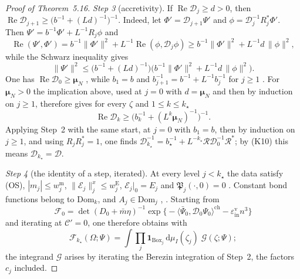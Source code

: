 \documentclass[11pt]{amsart}
\theoremstyle{definition}
\begin{document}
\begin{proof}[Proof of Theorem~5.16]
\emph{Step 3} (accretivity).
If $\operatorname{Re}\mathcal D_j\ge d>0$, then $\operatorname{Re}\mathcal D_{j+1}\ge\bigl(b^{-1}+(Ld)^{-1}\bigr)^{-1}$.
Indeed, let $\Phi'=\mathcal D_{j+1}\Psi'$ and $\phi=\mathcal D_j^{-1}R_j^*\Phi'$.
Then $\Psi'=b^{-1}\Phi'+L^{-1}R_j\phi$ and
\begin{equation*}
\operatorname{Re}(\Psi',\Phi')=b^{-1}\|\Phi'\|^2+L^{-1}\operatorname{Re}(\phi,\mathcal D_j\phi)\ge b^{-1}\|\Phi'\|^2+L^{-1}d\,\|\phi\|^2,
\end{equation*}
while the Schwarz inequality gives
\begin{equation*}
\|\Psi'\|^2\le\bigl(b^{-1}+(Ld)^{-1}\bigr)\bigl(b^{-1}\|\Phi'\|^2+L^{-1}d\,\|\phi\|^2\bigr).
\end{equation*}
One has $\operatorname{Re}\mathcal D_0\ge\boldsymbol\mu_N$ \cite[(I.O2)]{QEDIII}, while $b_1=b$ and $b_{j+1}^{-1}=b^{-1}+L^{-1}b_j^{-1}$ for $j\ge1$ \cite[Section~I.3.4]{QEDIII}.
For $\boldsymbol\mu_N>0$ the implication above, used at $j=0$ with $d=\boldsymbol\mu_N$ and then by induction on $j\ge1$, therefore gives for every $\zeta$ and $1\le k\le k_\star$
\begin{equation*}
\operatorname{Re}\mathcal D_k\ge\bigl(b_k^{-1}+(L^k\boldsymbol\mu_N)^{-1}\bigr)^{-1}.
\end{equation*}
Applying Step~2 with the same start, at $j=0$ with $b_1=b$, then by induction on $j\ge1$, and using $R_jR_j^*=1$, one finds $\mathcal D_{k_\star}^{-1}=\allowbreak b_\star^{-1}+L^{-k_\star}\mathcal R\mathcal D_0^{-1}\mathcal R^*$;
by (K10) this means $\mathcal D_{k_\star}=\mathcal D$.

\emph{Step 4} (the identity of a step, iterated).
At every level $j<k_\star$ the data satisfy (OS), $|m_j|\le w^{\mathrm m}_j$, $\|\mathscr E_j\|^x_j\le w^{\mathrm E}_j$, $\mathscr E_j|_0=E_j$ and $\mathfrak P_j(\cdot,0)=0$ \cite[Propositions~26.6\,(b), 28.1, 28.3\,(a), (b)]{QEDIII}.
Constant bond functions belong to $\mathrm{Dom}_k$, and $A_j\in\mathrm{Dom}_j$ \cite[Proposition~5.38\,(i), (ii)]{QEDI}, \cite{QEDIII}.
Starting from
\begin{equation*}
\mathscr F_0=\det(D_0+\bar m\eta)^{-1}\exp\bigl\{-\langle\bar\Psi_0,\mathcal D_0\Psi_0\rangle^{\mathrm{ch}}-\varepsilon^{\mathrm v}_{\mathrm{in}}n^3\bigr\}
\end{equation*}
\cite{QEDIII} and iterating \cite[Proposition~24.1\,(c)]{QEDIII} at $\mathscr C'=0$, one therefore obtains with \cite[(G5)$^{\mathrm w}$]{QEDIII}
\begin{equation*}
\mathscr F_{k_\star}(\Omega;\Psi)=\int\prod_j\mathbf 1_{\mathrm{Box}_j}\,\mathrm d\mu_I(\zeta_j)\;\mathcal G(\zeta;\Psi);
\end{equation*}
the integrand $\mathcal G$ arises by iterating the Berezin integration of Step~2, the factors $c_j$ included.


\end{proof}
\end{document}
